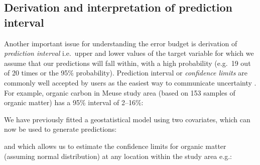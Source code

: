 \documentclass[graybox,natbib,nospthms,UStrade]{svmono}
\newenvironment{Shaded}{\begin{snugshade}}{\end{snugshade}}
\newcommand{\CommentTok}[1]{\textcolor[rgb]{0.37,0.37,0.37}{\textit{#1}}}
\newcommand{\DataTypeTok}[1]{\textcolor[rgb]{0.27,0.27,0.27}{#1}}
\newcommand{\DecValTok}[1]{\textcolor[rgb]{0.06,0.06,0.06}{#1}}
\newcommand{\FloatTok}[1]{\textcolor[rgb]{0.06,0.06,0.06}{#1}}
\newcommand{\KeywordTok}[1]{\textcolor[rgb]{0.27,0.27,0.27}{\textbf{#1}}}
\newcommand{\NormalTok}[1]{#1}
\newcommand{\OperatorTok}[1]{\textcolor[rgb]{0.43,0.43,0.43}{\textbf{#1}}}
\newcommand{\OtherTok}[1]{\textcolor[rgb]{0.37,0.37,0.37}{#1}}
\newcommand{\StringTok}[1]{\textcolor[rgb]{0.5,0.5,0.5}{#1}}
\begin{document}
\hypertarget{derivation-and-interpretation-of-prediction-interval}{%
\subsection{Derivation and interpretation of prediction interval}\label{derivation-and-interpretation-of-prediction-interval}}

Another important issue for understanding the error budget is derivation
of \emph{prediction interval} i.e.~upper and lower values of the target
variable for which we assume that our predictions will fall within, with
a high probability (e.g.~19 out of 20 times or the 95\% probability).
Prediction interval or \emph{confidence limits} are commonly well accepted by
users as the easiest way to communicate uncertainty
\citep{brodlie2012review}. For example, organic carbon in Meuse study area
(based on 153 samples of organic matter) has a 95\% interval of 2--16\%:

\begin{Shaded}
\end{Shaded}

We have previously fitted a geostatistical model using two covariates,
which can now be used to generate predictions:

\begin{Shaded}
\end{Shaded}

and which allows us to estimate the confidence limits for organic matter
(assuming normal distribution) at any location within the study area
e.g.:
\end{document}
